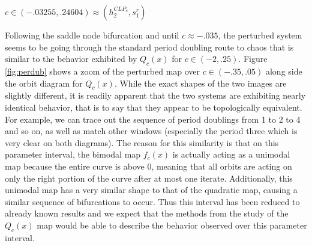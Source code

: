 	

	\underline{$c \in (-.03255, .24604) \approx (h_2^{CLP_c}, s_1^r)$}

	Following the saddle node bifurcation and until $c \approx -.035$, the perturbed system seems to be going through the standard period doubling route to chaos that is similar to the behavior exhibited by $Q_c (x)$ for $c \in (-2,.25)$. Figure \ref{fig:perdub} shows a zoom of the perturbed map over $c\in (-.35, .05)$ along side the orbit diagram for $Q_c (x)$. While the exact shapes of the two images are slightly different, it is readily apparent that the two systems are exhibiting nearly identical behavior, that is to say that they appear to be topologically equivalent. For example, we can trace out the sequence of period doublings from 1 to 2 to 4 and so on, as well as match other windows (especially the period three which is very clear on both diagrams). The reason for this similarity is that on this parameter interval, the bimodal map $f_c (x)$ is actually acting as a unimodal map because the entire curve is above 0, meaning that all orbits are acting on only the right portion of the curve after at most one iterate. Additionally, this unimodal map has a very similar shape to that of the quadratic map, causing a similar sequence of bifurcations to occur. Thus this interval has been reduced to already known results and we expect that the methods from the study of the $Q_c (x)$ map would be able to describe the behavior observed over this parameter interval.

